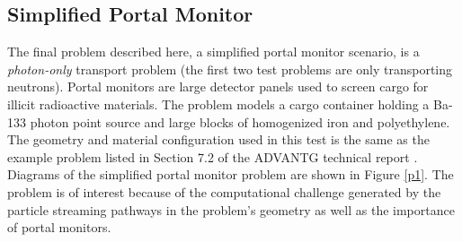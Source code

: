 \documentclass{article} %
\begin{document}
\subsection{Simplified Portal Monitor}

The final problem described here, a simplified portal monitor scenario, is a
\textit{photon-only} transport problem (the first two test problems are only transporting neutrons). Portal monitors are large detector
panels used to screen cargo for illicit radioactive materials. The problem
models a cargo container holding a Ba-133 photon point source and large blocks
of homogenized iron and polyethylene. The geometry and material configuration
used in this test is the same as the example problem listed in Section 7.2 of
the ADVANTG technical report \cite{advantg}. Diagrams of the simplified portal
monitor problem are shown in Figure \ref{p1}. The problem is of interest
because of the computational challenge generated by the particle streaming
pathways in the problem's geometry as well as the importance of portal
monitors.
\end{document}
